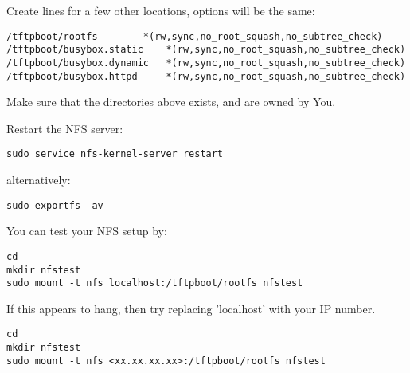 Create lines for a few other locations, options will be the same:
\begin{verbatim}
/tftpboot/rootfs		*(rw,sync,no_root_squash,no_subtree_check)
/tftpboot/busybox.static	*(rw,sync,no_root_squash,no_subtree_check)
/tftpboot/busybox.dynamic	*(rw,sync,no_root_squash,no_subtree_check)
/tftpboot/busybox.httpd		*(rw,sync,no_root_squash,no_subtree_check)
\end{verbatim}

Make sure that the directories above exists, and are owned by You.

Restart the NFS server:

\begin{verbatim}
sudo service nfs-kernel-server restart
\end{verbatim}

alternatively:

\begin{verbatim}
sudo exportfs -av
\end{verbatim}

You can test your NFS setup by:

\begin{verbatim}
cd
mkdir nfstest
sudo mount -t nfs localhost:/tftpboot/rootfs nfstest
\end{verbatim}

\clearpage
If this appears to hang, then try replacing 'localhost' with your IP number.

\begin{verbatim}
cd
mkdir nfstest
sudo mount -t nfs <xx.xx.xx.xx>:/tftpboot/rootfs nfstest
\end{verbatim}

